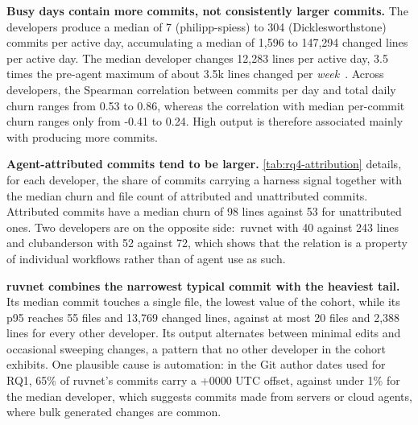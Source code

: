 \documentclass[smallextended]{svjour3}
\begin{document}
\textbf{Busy days contain more commits, not consistently larger commits.} The
developers produce a median of 7 (philipp-spiess) to 304 (Dicklesworthstone)
commits per active day, accumulating a median of 1,596 to 147,294 changed lines
per active day.
The median developer changes 12,283 lines per active day, 3.5 times the pre-agent maximum of about 3.5k lines changed per \emph{week}~\cite{zhang2024workrhythms}.
Across developers, the Spearman correlation between commits per day and total
daily churn ranges from 0.53 to 0.86, whereas the correlation with median
per-commit churn ranges only from -0.41 to 0.24. High output is therefore
associated mainly with producing more commits.

\textbf{Agent-attributed commits tend to be larger.}
\autoref{tab:rq4-attribution} details, for each developer, the share of commits carrying a harness signal together with the median churn and file count of attributed and unattributed commits.
Attributed commits have a median churn of 98 lines against 53 for
unattributed ones. Two developers are on the opposite side:~ruvnet with
40 against 243 lines and clubanderson with 52 against 72, which shows that the
relation is a property of individual workflows rather than of agent use as such.

\textbf{ruvnet combines the narrowest typical commit with the heaviest tail.}
Its median commit touches a single file, the lowest value of the cohort, while
its p95 reaches 55 files and 13,769 changed lines, against at most 20 files and
2,388 lines for every other developer. Its output alternates between minimal
edits and occasional sweeping changes, a pattern that no other
developer in the cohort exhibits.
One plausible cause is automation: in the Git author dates used for RQ1, 65\% of ruvnet's commits carry a +0000 UTC offset, against under 1\% for the median developer, which suggests commits made from servers or cloud agents, where bulk generated changes are common.
\end{document}
